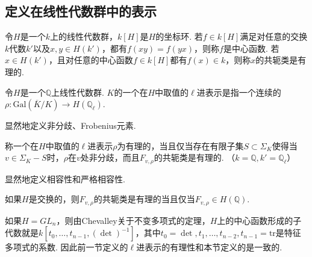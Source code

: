 \subsection{定义在线性代数群中的表示}

\begin{cdef}
    令$H$是一个$k$上的线性代数群，$k[H]$是$H$的坐标环. 若$f\in k[H]$满足对任意的交换$k$代数$k'$以及$x,y\in H(k')$，都有$f(xy)=f(yx)$，则称$f$是中心函数. 若$x\in H(k')$，且对任意的中心函数$f\in k[H]$都有$f(x)\in k$，则称$x$的共轭类是有理的.
\end{cdef}

\begin{cdef}
    令$H$是一个$\mathbb{Q}$上线性代数群. $K$的一个在$H$中取值的$\ell$进表示是指一个连续的$\rho: \mathrm{Gal}(\overline{K}/K)\to H(\mathbb{Q}_{\ell})$.
\end{cdef}

显然地定义非分歧、Frobenius元素.

\begin{cdef}
    称一个在$H$中取值的$\ell$进表示$\rho$为有理的，当且仅当存在有限子集$S\subset \Sigma_K$使得当$v\in \Sigma_K - S$时，$\rho$在$v$处非分歧，而且$F_{v, \rho}$的共轭类是有理的. （$k=\mathbb{Q}, k'=\mathbb{Q}_{\ell}$）
\end{cdef}

显然地定义相容性和严格相容性.

\begin{crem}
    如果$H$是交换的，则$F_{v,\rho}$的共轭类是有理的当且仅当$F_{v,\rho} \in H(\mathbb{Q})$.
\end{crem}

\begin{crem}
    如果$H = GL_n$，则由Chevalley关于不变多项式的定理，$H$上的中心函数形成的子代数就是$k[t_0,\ldots,t_{n-1}, (\det)^{-1}]$，其中$t_0=\det,t_1,\ldots,t_{n-2},t_{n-1}=\mathrm{tr}$是特征多项式的系数. 因此前一节定义的$\ell$进表示的有理性和本节定义的是一致的.
\end{crem}
